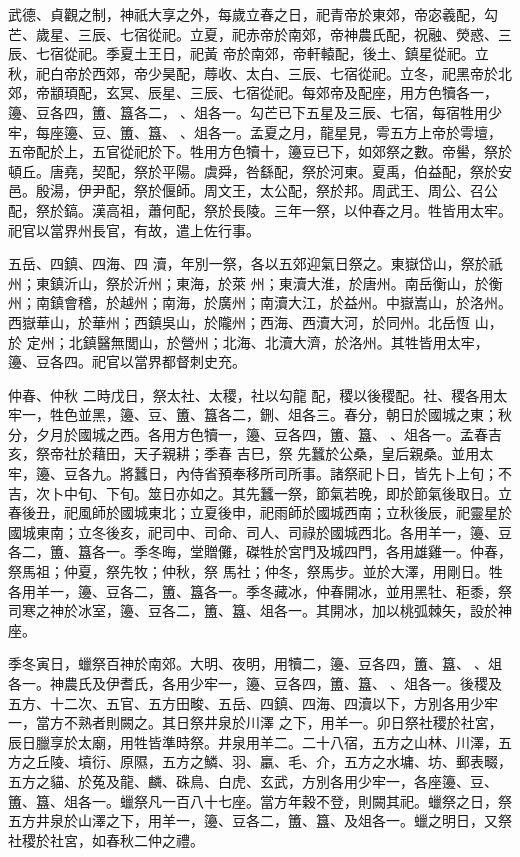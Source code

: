 
\begin{pinyinscope}

 武德、貞觀之制，神祇大享之外，每歲立春之日，祀青帝於東郊，帝宓羲配，勾芒、歲星、三辰、七宿從祀。立夏，祀赤帝於南郊，帝神農氏配，祝融、熒惑、三辰、七宿從祀。季夏土王日，祀黃
 帝於南郊，帝軒轅配，後土、鎮星從祀。立秋，祀白帝於西郊，帝少昊配，蓐收、太白、三辰、七宿從祀。立冬，祀黑帝於北郊，帝顓頊配，玄冥、辰星、三辰、七宿從祀。每郊帝及配座，用方色犢各一，籩、豆各四，簠、簋各二，、俎各一。勾芒已下五星及三辰、七宿，每宿牲用少牢，每座籩、豆、簠、簋、、俎各一。孟夏之月，龍星見，雩五方上帝於雩壇，五帝配於上，五官從祀於下。牲用方色犢十，籩豆已下，如郊祭之數。帝嚳，祭於頓丘。唐堯，契配，祭於平陽。虞舜，咎繇配，祭於河東。夏禹，伯益配，祭於安邑。殷湯，伊尹配，祭於偃師。周文王，太公配，祭於邦。周武王、周公、召公配，祭於鎬。漢高祖，蕭何配，祭於長陵。三年一祭，以仲春之月。牲皆用太牢。祀官以當界州長官，有故，遣上佐行事。



 五岳、四鎮、四海、四
 瀆，年別一祭，各以五郊迎氣日祭之。東嶽岱山，祭於祇州；東鎮沂山，祭於沂州；東海，於萊
 州；東瀆大淮，於唐州。南岳衡山，於衡州；南鎮會稽，於越州；南海，於廣州；南瀆大江，於益州。中嶽嵩山，於洛州。西嶽華山，於華州；西鎮吳山，於隴州；西海、西瀆大河，於同州。北岳恆
 山，於
 定州；北鎮醫無閭山，於營州；北海、北瀆大濟，於洛州。其牲皆用太牢，籩、豆各四。祀官以當界都督刺史充。



 仲春、仲秋
 二時戊日，祭太社、太稷，社以勾龍
 配，稷以後稷配。社、稷各用太牢一，牲色並黑，籩、豆、簠、簋各二，鉶、俎各三。春分，朝日於國城之東；秋分，夕月於國城之西。各用方色犢一，籩、豆各四，簠、簋、、俎各一。孟春吉亥，祭帝社於藉田，天子親耕；季春
 吉巳，祭
 先蠶於公桑，皇后親桑。並用太牢，籩、豆各九。將蠶日，內侍省預奉移所司所事。諸祭祀卜日，皆先卜上旬；不吉，次卜中旬、下旬。筮日亦如之。其先蠶一祭，節氣若晚，即於節氣後取日。立春後丑，祀風師於國城東北；立夏後申，祀雨師於國城西南；立秋後辰，祀靈星於國城東南；立冬後亥，祀司中、司命、司人、司祿於國城西北。各用羊一，籩、豆各二，簠、簋各一。季冬晦，堂贈儺，磔牲於宮門及城四門，各用雄雞一。仲春，祭馬祖；仲夏，祭先牧；仲秋，祭
 馬社；仲冬，祭馬步。並於大澤，用剛日。牲各用羊一，籩、豆各二，簠、簋各一。季冬藏冰，仲春開冰，並用黑牡、秬黍，祭司寒之神於冰室，籩、豆各二，簠、簋、俎各一。其開冰，加以桃弧棘矢，設於神座。



 季冬寅日，蠟祭百神於南郊。大明、夜明，用犢二，籩、豆各四，簠、簋、、俎各一。神農氏及伊耆氏，各用少牢一，籩、豆各四，簠、簋、、俎各一。後稷及五方、十二次、五官、五方田畯、五岳、四鎮、四海、四瀆以下，方別各用少牢一，當方不熟者則闕之。其日祭井泉於川澤
 之下，用羊一。卯日祭社稷於社宮，辰日臘享於太廟，用牲皆準時祭。井泉用羊二。二十八宿，五方之山林、川澤，五方之丘陵、墳衍、原隰，五方之鱗、羽、臝、毛、介，五方之水墉、坊、郵表畷，五方之貓、於菟及龍、麟、硃鳥、白虎、玄武，方別各用少牢一，各座籩、豆、簠、簋、俎各一。蠟祭凡一百八十七座。當方年穀不登，則闕其祀。蠟祭之日，祭五方井泉於山澤之下，用羊一，籩、豆各二，簠、簋、及俎各一。蠟之明日，又祭社稷於社宮，如春秋二仲之禮。




\end{pinyinscope}

